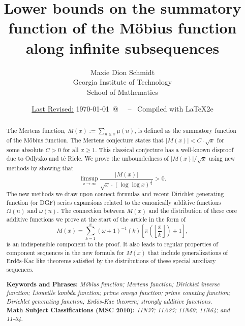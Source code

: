 \documentclass[11pt,reqno,a4letter]{article}
\title{
       \LARGE{
       Lower bounds on the summatory function of the M\"obius function along infinite subsequences 
       } 
}
\author{{\Large Maxie Dion Schmidt} \\ 
        {\normalsize Georgia Institute of Technology} \\[0.025cm] 
        {\normalsize School of Mathematics} 
}
\date{\small\underline{Last Revised:} \today \ @\ \hhmmsstime{} \ -- \ Compiled with \LaTeX2e}
\numberwithin{figure}{section}
\numberwithin{table}{section}
\theoremstyle{plain}
\numberwithin{theorem}{section}
\theoremstyle{definition}
\begin{document}
 

\maketitle

\begin{abstract} 
The Mertens function, $M(x) := \sum_{n \leq x} \mu(n)$, is 
defined as the summatory function of the M\"obius function. 
The Mertens conjecture states that $|M(x)| < C \cdot \sqrt{x}$ for some absolute $C > 0$ for all 
$x \geq 1$. 
This classical conjecture has a well-known disproof due to 
Odlyzko and t\'{e} Riele. 
We prove the unboundedness of $|M(x)| / \sqrt{x}$ using new methods by showing that 
$$\limsup_{x \rightarrow \infty} \frac{|M(x)|}{\sqrt{x} \cdot (\log\log x)^{\frac{1}{2}}} > 0.$$ 
The new methods we draw upon connect formulas and recent 
Dirichlet generating function (or DGF) series expansions related to the canonically 
additive functions $\Omega(n)$ and $\omega(n)$. 
The connection between $M(x)$ and the distribution of these core additive functions 
we prove at the start of the article in the form of 
\[
M(x) = \sum_{k=1}^{x} (\omega + 1)^{-1}(k) \left[\pi\left(\left\lfloor \frac{x}{k} \right\rfloor\right) + 1\right],
\]
is an indispensible component to the proof. 
It also leads to regular properties of component sequences in the new formula for $M(x)$ that include 
generalizations of Erd\"os-Kac like theorems satisfied by the distributions of these special auxiliary 
sequences. 

\bigskip 
\noindent
\textbf{Keywords and Phrases:} {\it M\"obius function; Mertens function; 
                                    Dirichlet inverse function; Liouville lambda function; prime omega function; 
                                    prime counting function; Dirichlet generating function; 
                                    Erd\"os-Kac theorem; strongly additive functions. } \\ 
\textbf{Math Subject Classifications (MSC 2010):} {\it 11N37; 11A25; 11N60; 11N64; and 11-04. } 
\end{abstract} 
\end{document}
